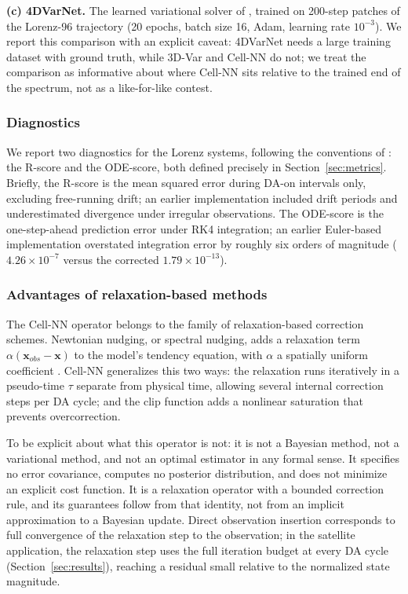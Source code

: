 \documentclass[final,5p,times,twocolumn,authoryear]{elsarticle}
\begin{document}
\textbf{(c) 4DVarNet.} The learned variational solver of
\citet{fablet2021}, trained on 200-step patches of the Lorenz-96
trajectory (20 epochs, batch size 16, Adam, learning rate
$10^{-3}$). We report this comparison with an explicit caveat:
4DVarNet needs a large training dataset with ground truth, while
3D-Var and Cell-NN do not; we treat the comparison as informative
about where Cell-NN sits relative to the trained end of the
spectrum, not as a like-for-like contest.

\subsubsection{Diagnostics}
\label{sec:diagnostics}

We report two diagnostics for the Lorenz systems, following the
conventions of \citet{fablet2021}: the R-score and the ODE-score,
both defined precisely in Section~\ref{sec:metrics}. Briefly, the
R-score is the mean squared error during DA-on intervals only,
excluding free-running drift; an earlier implementation included
drift periods and underestimated divergence under irregular
observations. The ODE-score is the one-step-ahead prediction error
under RK4 integration; an earlier Euler-based implementation
overstated integration error by roughly six orders of magnitude
($4.26\times10^{-7}$ versus the corrected $1.79\times10^{-13}$).

\subsubsection{Advantages of relaxation-based methods}
\label{sec:nudging}

The Cell-NN operator belongs to the family of relaxation-based
correction schemes. Newtonian nudging, or spectral nudging, adds a
relaxation term $\alpha(\mathbf{x}_{obs} - \mathbf{x})$ to the
model's tendency equation, with $\alpha$ a spatially uniform
coefficient \citep{kalnay2003}. Cell-NN generalizes this two ways:
the relaxation runs iteratively in a pseudo-time $\tau$ separate
from physical time, allowing several internal correction steps per
DA cycle; and the clip function adds a nonlinear saturation that
prevents overcorrection.

To be explicit about what this operator is not: it is not a Bayesian
method, not a variational method, and not an optimal estimator in
any formal sense. It specifies no error covariance, computes no
posterior distribution, and does not minimize an explicit cost
function. It is a relaxation operator with a bounded correction rule,
and its guarantees follow from that identity, not from an implicit
approximation to a Bayesian update. Direct observation insertion
corresponds to full convergence of the relaxation step to the
observation; in the satellite application, the relaxation step uses
the full iteration budget at every DA cycle
(Section~\ref{sec:results}), reaching a residual small relative to
the normalized state magnitude.
\end{document}
